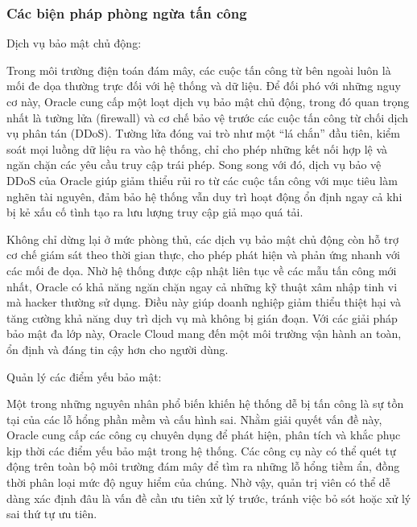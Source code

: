 \subsubsection{Các biện pháp phòng ngừa tấn công}
\begin{myitem}
    \item Dịch vụ bảo mật chủ động:
    \begin{mysubitem}
        \item Trong môi trường điện toán đám mây, các cuộc tấn công từ bên ngoài luôn là mối đe dọa thường trực đối với hệ thống và dữ liệu. Để đối phó với những nguy cơ này, Oracle cung cấp một loạt dịch vụ bảo mật chủ động, trong đó quan trọng nhất là tường lửa (firewall) và cơ chế bảo vệ trước các cuộc tấn công từ chối dịch vụ phân tán (DDoS). Tường lửa đóng vai trò như một “lá chắn” đầu tiên, kiểm soát mọi luồng dữ liệu ra vào hệ thống, chỉ cho phép những kết nối hợp lệ và ngăn chặn các yêu cầu truy cập trái phép. Song song với đó, dịch vụ bảo vệ DDoS của Oracle giúp giảm thiểu rủi ro từ các cuộc tấn công với mục tiêu làm nghẽn tài nguyên, đảm bảo hệ thống vẫn duy trì hoạt động ổn định ngay cả khi bị kẻ xấu cố tình tạo ra lưu lượng truy cập giả mạo quá tải.

        \item Không chỉ dừng lại ở mức phòng thủ, các dịch vụ bảo mật chủ động còn hỗ trợ cơ chế giám sát theo thời gian thực, cho phép phát hiện và phản ứng nhanh với các mối đe dọa. Nhờ hệ thống được cập nhật liên tục về các mẫu tấn công mới nhất, Oracle có khả năng ngăn chặn ngay cả những kỹ thuật xâm nhập tinh vi mà hacker thường sử dụng. Điều này giúp doanh nghiệp giảm thiểu thiệt hại và tăng cường khả năng duy trì dịch vụ mà không bị gián đoạn. Với các giải pháp bảo mật đa lớp này, Oracle Cloud mang đến một môi trường vận hành an toàn, ổn định và đáng tin cậy hơn cho người dùng.
    \end{mysubitem}

    \item Quản lý các điểm yếu bảo mật:
    \begin{mysubitem}
        \item Một trong những nguyên nhân phổ biến khiến hệ thống dễ bị tấn công là sự tồn tại của các lỗ hổng phần mềm và cấu hình sai. Nhằm giải quyết vấn đề này, Oracle cung cấp các công cụ chuyên dụng để phát hiện, phân tích và khắc phục kịp thời các điểm yếu bảo mật trong hệ thống. Các công cụ này có thể quét tự động trên toàn bộ môi trường đám mây để tìm ra những lỗ hổng tiềm ẩn, đồng thời phân loại mức độ nguy hiểm của chúng. Nhờ vậy, quản trị viên có thể dễ dàng xác định đâu là vấn đề cần ưu tiên xử lý trước, tránh việc bỏ sót hoặc xử lý sai thứ tự ưu tiên.


\end{mysubitem}
\end{myitem}
